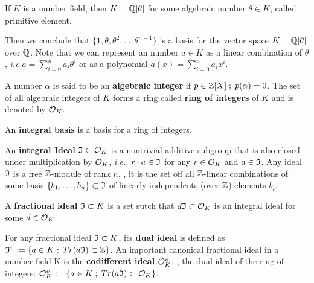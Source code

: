 \documentclass[Ingles]{ic-tese-v3}
\begin{document}
\begin{theorem}
   If $K$ is a number field, then $K = \mathbb{Q}[\theta]$ for some
  algebraic number $\theta \in K$, called primitive element.
\end{theorem}

Then we conclude that \(\{1, \theta, \theta^2, ... , \theta^{n-1}\}\) is a basis for the vector
space \(K = \mathbb{Q}[\theta]\) over \(\mathbb{Q}\). Note that we can represent an number \(a \in K\) as a linear combination of \(\theta\), \emph{i.e} \(a = \sum^n_{i=0}{a_i\theta^i}\) or as a polynomial \(a(x) = \sum^n_{i=0}{a_ix^i}\).

\begin{definition}
A number $\alpha$ is said to be an \textbf{algebraic integer} if $ p \in \mathbb{Z}[X] \;;\; p(\alpha) = 0$. The set of all algebraic integers of $K$ forms a ring called \textbf{ring of integers} of $K$ and is denoted by $\mathcal{O}_K$.
\end{definition}

\begin{definition}
An \textbf{integral basis} is a basis for a ring of integers. 
\end{definition}

\begin{definition}
  An \textbf{integral Ideal} $\mathfrak{I} \subset \mathcal{O}_K$ is a  nontrivial additive subgroup that
  is also closed under multiplication by $\mathcal{O}_K$, \textit{i.e.}, $r \cdot a \in \mathfrak{I}$ for
  any $r \in \mathcal{O}_K$ and $a \in \mathfrak{I}$. Any ideal $\mathfrak{I}$ is a free $\mathbb{Z}$-module of rank
  $n$, \ie, it is the set off all $\mathbb{Z}$-linear combinations of some basis
  $\{b_1,\dots,b_n\} \subset \mathfrak{I}$  of linearly independents (over $\mathbb{Z}$) elements $b_i$.
\end{definition}

\begin{definition}
  A \textbf{fractional ideal} $\mathfrak{I} \subset K$ is a set sutch that $d\mathfrak{I} \subset \mathcal{O}_K$ is an
  integral ideal for some $d \in \mathcal{O}_K$
\end{definition}

\begin{definition}
  For any fractional ideal $\mathfrak{I} \subset K$, its \textbf{dual ideal} is defined as
  $\mathfrak{I}^v \vcentcolon = \{ a \in K \;;\; Tr(a\mathfrak{I}) \subset \mathbb{Z} \}$. An important canonical
  fractional ideal in a number field K is the \textbf{codifferent ideal}
  $\mathcal{O}_K^v$, \ie, the dual ideal of the ring of integers: $\mathcal{O}_K^v \vcentcolon = \{ a \in K \;;\; Tr(a\mathfrak{I}) \subset \mathcal{O}_K \}$.
\end{definition}
\end{document}
